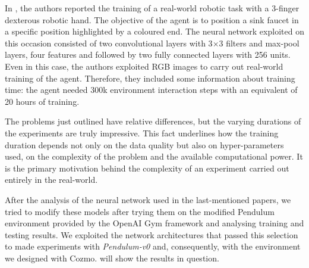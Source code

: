 In \cite{haarnoja2018alg}, the authors reported the training of a real-world robotic task with a 3-finger dexterous robotic hand.
The objective of the agent is to position a sink faucet in a specific position highlighted by a coloured end.
The neural network exploited on this occasion consisted of two convolutional layers with 3$\times$3 filters and max-pool layers, four features and followed by two fully connected layers with 256 units.
Even in this case, the authors exploited RGB images to carry out real-world training of the agent.
Therefore, they included some information about training time: the agent needed 300k environment interaction steps with an equivalent of 20 hours of training.

The problems just outlined have relative differences, but the varying durations of the experiments are truly impressive.
This fact underlines how the training duration depends not only on the data quality but also on hyper-parameters used, on the complexity of the problem and the available computational power.
It is the primary motivation behind the complexity of an experiment carried out entirely in the real-world.

After the analysis of the neural network used in the last-mentioned papers, we tried to modify these models after trying them on the modified Pendulum environment provided by the OpenAI Gym framework and analysing training and testing results.
We exploited the network architectures that passed this selection to made experiments with \textit{Pendulum-v0} and, consequently, with the environment we designed with Cozmo.  will show the results in question.

